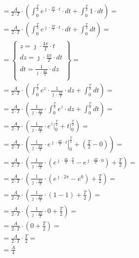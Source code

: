 \begin{task}
\begin{align*}
&=\frac{A}{2\cdot T}\cdot \left( \int_{0}^{\frac{T}{2}} e^{\jmath \cdot \frac{4\pi}{T} \cdot t } \cdot dt + \int_{0}^{\frac{T}{2}} 1 \cdot dt\right)=\\
&=\frac{A}{2\cdot T}\cdot \left( \int_{0}^{\frac{T}{2}} e^{\jmath \cdot \frac{4\pi}{T} \cdot t } \cdot dt + \int_{0}^{\frac{T}{2}} dt\right)=\\
&=\begin{Bmatrix}
z=\jmath \cdot \frac{4\pi}{T} \cdot t \\
dz=\jmath \cdot \frac{4\pi}{T} \cdot dt \\
dt=\frac{1}{\jmath \cdot \frac{4\pi}{T}} \cdot dz \\
\end{Bmatrix}=\\
&=\frac{A}{2\cdot T}\cdot \left( \int_{0}^{\frac{T}{2}} e^{z } \cdot \frac{1}{\jmath \cdot \frac{4\pi}{T}}\cdot dz + \int_{0}^{\frac{T}{2}} dt \right)=\\
&=\frac{A}{2\cdot T}\cdot \left(\frac{1}{\jmath \cdot \frac{4\pi}{T}}\cdot \int_{0}^{\frac{T}{2}} e^{z} \cdot dz + \int_{0}^{\frac{T}{2}} dt\right)=\\
&=\frac{A}{2\cdot T}\cdot \left( \frac{1}{\jmath \cdot \frac{4\pi}{T}}\cdot \left. e^{z} \right|_{0}^{\frac{T}{2}} + \left. t \right|_{0}^{\frac{T}{2}}\right)=\\
&=\frac{A}{2\cdot T}\cdot \left( \frac{1}{\jmath \cdot \frac{4\pi}{T}}\cdot \left. e^{\jmath \cdot \frac{4\pi}{T} \cdot t} \right|_{0}^{\frac{T}{2}} + \left(\frac{T}{2} - 0 \right) \right)=\\
&=\frac{A}{2\cdot T}\cdot \left( \frac{1}{\jmath \cdot \frac{4\pi}{T}}\cdot \left( e^{\jmath \cdot \frac{4\pi}{T} \cdot \frac{T}{2}} - e^{\jmath \cdot \frac{4\pi}{T} \cdot 0}\right) + \frac{T}{2} \right)=\\
&=\frac{A}{2\cdot T}\cdot \left( \frac{1}{\jmath \cdot \frac{4\pi}{T}}\cdot \left( e^{\jmath \cdot 2\pi} - e^{0}\right) + \frac{T}{2} \right)=\\
&=\frac{A}{2\cdot T}\cdot \left( \frac{1}{\jmath \cdot \frac{4\pi}{T}}\cdot \left( 1 - 1\right) + \frac{T}{2} \right)=\\
&=\frac{A}{2\cdot T}\cdot \left( \frac{1}{\jmath \cdot \frac{4\pi}{T}}\cdot 0 + \frac{T}{2} \right)=\\
&=\frac{A}{2\cdot T}\cdot \left(  0 + \frac{T}{2} \right)=\\
&=\frac{A}{2\cdot T}\cdot \frac{T}{2} =\\
&=\frac{A}{4}
\end{align*}


\end{task}
